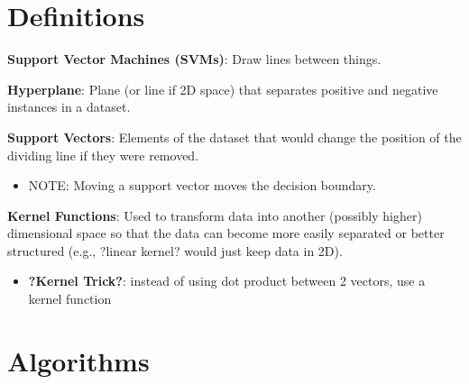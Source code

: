 \documentclass{article}
\begin{document}
\section{Definitions}

	\item {\bf Support Vector Machines (SVMs)}: Draw lines between things.
	\item {\bf Hyperplane}: Plane (or line if 2D space) that separates positive and negative instances in a dataset.
	\item {\bf Support Vectors}: Elements of the dataset that would change the position of the dividing line if they were removed.
		\begin{itemize}
			\item NOTE: Moving a support vector moves the decision boundary.
		\end{itemize} 
	\item {\bf Kernel Functions}: Used to transform data into another (possibly higher) dimensional space so that the data can become more easily separated or better structured (e.g., ?linear kernel? would just keep data in 2D).
		\begin{itemize}
			\item {\bf ?Kernel Trick?}: instead of using dot product between 2 vectors, use a kernel function
		\end{itemize}

\section{Algorithms}
\end{document}
